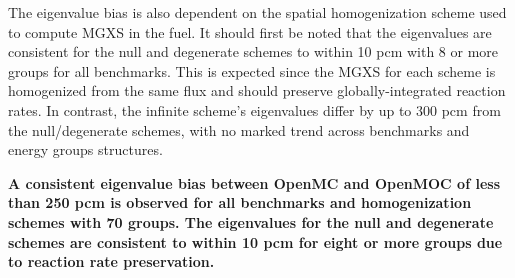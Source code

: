 
The eigenvalue bias is also dependent on the spatial homogenization scheme used to compute \ac{MGXS} in the fuel. It should first be noted that the eigenvalues are consistent for the null and degenerate schemes to within 10 \ac{pcm} with 8 or more groups for all benchmarks. This is expected since the \ac{MGXS} for each scheme is homogenized from the same flux and should preserve globally-integrated reaction rates. In contrast, the infinite scheme's eigenvalues differ by up to 300 \ac{pcm} from the null/degenerate schemes, with no marked trend across benchmarks and energy groups structures.



\begin{emphbox}
\textbf{A consistent eigenvalue bias between OpenMC and OpenMOC of less than 250 \ac{pcm} is observed for all benchmarks and homogenization schemes with 70 groups. The eigenvalues for the null and degenerate schemes are consistent to within 10 \ac{pcm} for eight or more groups due to reaction rate preservation.}
\end{emphbox}

